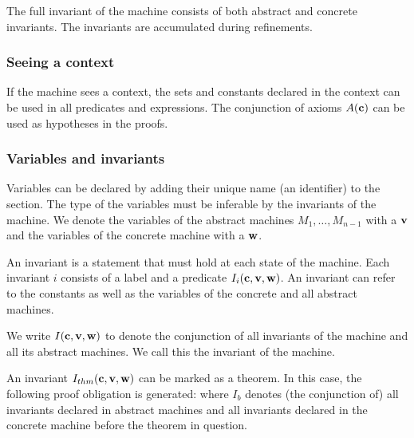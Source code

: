 The full invariant of the machine consists of both abstract and concrete invariants. 
The invariants are accumulated during refinements.


\subsubsection{Seeing a context}
If the machine sees a context, the sets and constants declared in the context can be used in
 all predicates and expressions.
The conjunction of axioms $A(\mathbf{c})$ can be used as hypotheses in the proofs.

\subsubsection{Variables and invariants}
Variables can be declared by adding their unique name (an identifier) to the  section. 
The type of the variables must be inferable by the invariants of the machine.
We denote the variables of the abstract machines $M_1,\ldots,M_{n-1}$ with a $\mathbf{v}$ and the variables of the concrete machine with a $\mathbf{w}$.

An invariant is a statement that must hold at each state of the machine.
Each invariant $i$ consists of a label and a predicate $I_i(\mathbf{c},\mathbf{v},\mathbf{w})$.
An invariant can refer to the constants as well as the variables of the concrete and all abstract machines.

We write $I(\mathbf{c},\mathbf{v},\mathbf{w})$ to denote the conjunction of all invariants
of the machine and all its abstract machines. We call this the invariant of the machine.

An invariant $I_{thm}(\mathbf{c},\mathbf{v},\mathbf{w})$ can be marked as a theorem. In this case, the following proof obligation is generated:
where $I_b$ denotes (the conjunction of) all invariants declared in abstract machines and all invariants declared in the concrete machine before
the theorem in question.

